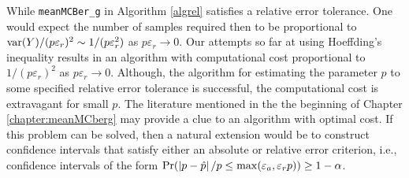 \documentclass{iitthesis}
\theoremstyle{definition}
\begin{document}
While {\tt meanMCBer\_g} in Algorithm \ref{algrel} satisfies a relative error tolerance. One would expect the number of samples required then to be proportional to $\operatorname{var}(Y)/(p \varepsilon_r)^2 \sim 1/(p \varepsilon_r^2)$ as $p\varepsilon_r \to 0$.  Our attempts so far at using Hoeffding's inequality results in an algorithm with computational cost proportional to $1/(p \varepsilon_r)^2$ as $p\varepsilon_r \to 0$.  Although, the algorithm for estimating the parameter $p$ to some specified relative error tolerance is successful, the computational cost is extravagant for small $p$. The literature mentioned in the the beginning of Chapter \ref{chapter:meanMCberg} may provide a clue to an algorithm with optimal cost.  If this problem can be solved, then a natural extension would be to construct confidence intervals that satisfy either an absolute or relative error criterion, i.e., confidence intervals of the form $\Pr(\left \lvert p-\hat{p} \right \rvert/p\leq \max(\varepsilon_a, \varepsilon_r p)) \geq 1-\alpha$.
%
%
%
%
%
\end{document}
